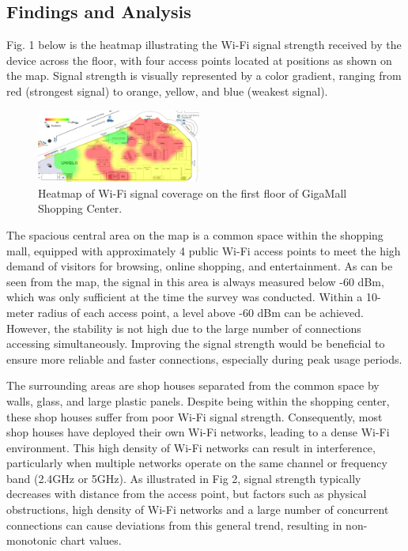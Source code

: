 \documentclass[conference]{IEEEtran}
\begin{document}
\subsection{Findings and Analysis}

Fig. 1 below is the heatmap illustrating the Wi-Fi signal strength received by the device across the floor, with four access points located at positions as shown on the map. Signal strength is visually represented by a color gradient, ranging from red (strongest signal) to orange, yellow, and blue (weakest signal).

\begin{figure}[htbp]
    \centering
    \includegraphics[width=0.48\textwidth]{fig1_heatmap.png}
    \caption{Heatmap of Wi-Fi signal coverage on the first floor of GigaMall Shopping Center.}
\end{figure}

The spacious central area on the map is a common space within the shopping mall, equipped with approximately 4 public Wi-Fi access points to meet the high demand of visitors for browsing, online shopping, and entertainment. As can be seen from the map, the signal in this area is always measured below -60 dBm, which was only sufficient at the time the survey was conducted. Within a 10-meter radius of each access point, a level above -60 dBm can be achieved. However, the stability is not high due to the large number of connections accessing simultaneously. Improving the signal strength would be beneficial to ensure more reliable and faster connections, especially during peak usage periods.

The surrounding areas are shop houses separated from the common space by walls, glass, and large plastic panels. Despite being within the shopping center, these shop houses suffer from poor Wi-Fi signal strength. Consequently, most shop houses have deployed their own Wi-Fi networks, leading to a dense Wi-Fi environment. This high density of Wi-Fi networks can result in interference, particularly when multiple networks operate on the same channel or frequency band (2.4GHz or 5GHz). As illustrated in Fig 2, signal strength typically decreases with distance from the access point, but factors such as physical obstructions, high density of Wi-Fi networks and a large number of concurrent connections can cause deviations from this general trend, resulting in non-monotonic chart values.
\end{document}

